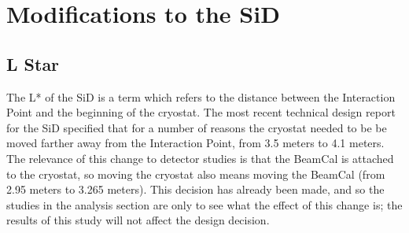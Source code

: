 \documentclass{report}
\begin{document}
        \section{Modifications to the SiD} \label{sect:sid_mods}
            \subsection{L Star}

                The L* of the SiD is a term which refers to the distance between the Interaction Point and the beginning of the cryostat. The most recent technical design report for the SiD specified that for a number of reasons the cryostat needed to be be moved farther away from the Interaction Point, from 3.5 meters to 4.1 meters. The relevance of this change to detector studies is that the BeamCal is attached to the cryostat, so moving the cryostat also means moving the BeamCal (from 2.95 meters to 3.265 meters). This decision has already been made, and so the studies in the analysis section are only to see what the effect of this change is; the results of this study will not affect the design decision.


\end{document}
